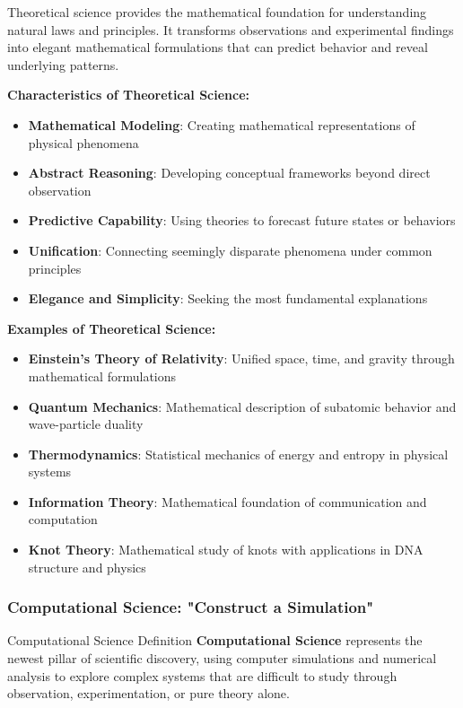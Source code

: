 Theoretical science provides the mathematical foundation for understanding natural laws and principles. It transforms observations and experimental findings into elegant mathematical formulations that can predict behavior and reveal underlying patterns.

\textbf{Characteristics of Theoretical Science:}
\begin{itemize}
    \item \textbf{Mathematical Modeling}: Creating mathematical representations of physical phenomena
    \item \textbf{Abstract Reasoning}: Developing conceptual frameworks beyond direct observation
    \item \textbf{Predictive Capability}: Using theories to forecast future states or behaviors
    \item \textbf{Unification}: Connecting seemingly disparate phenomena under common principles
    \item \textbf{Elegance and Simplicity}: Seeking the most fundamental explanations
\end{itemize}

\textbf{Examples of Theoretical Science:}
\begin{itemize}
    \item \textbf{Einstein's Theory of Relativity}: Unified space, time, and gravity through mathematical formulations
    \item \textbf{Quantum Mechanics}: Mathematical description of subatomic behavior and wave-particle duality
    \item \textbf{Thermodynamics}: Statistical mechanics of energy and entropy in physical systems
    \item \textbf{Information Theory}: Mathematical foundation of communication and computation
    \item \textbf{Knot Theory}: Mathematical study of knots with applications in DNA structure and physics
\end{itemize}

\subsubsection{Computational Science: "Construct a Simulation"}

\begin{conceptcard}{Computational Science Definition}
\textbf{Computational Science} represents the newest pillar of scientific discovery, using computer simulations and numerical analysis to explore complex systems that are difficult to study through observation, experimentation, or pure theory alone.
\end{conceptcard}

